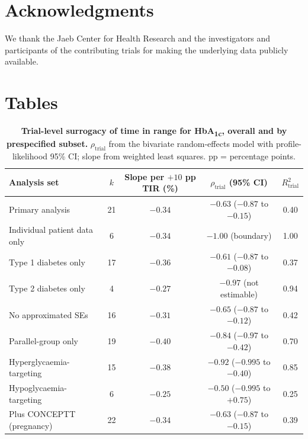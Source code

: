 \documentclass[11pt,a4paper]{article}
\newcommand{\pp}{percentage points}
\begin{document}
\section*{Acknowledgments}
We thank the Jaeb Center for Health Research and the investigators and participants of the contributing
trials for making the underlying data publicly available.

\clearpage

\section*{Tables}

\begin{table}[htbp]
\centering\small
\caption{\textbf{Trial-level surrogacy of time in range for HbA\textsubscript{1c}, overall and by
prespecified subset.} $\rho_{\mathrm{trial}}$ from the bivariate random-effects model with
profile-likelihood 95\% CI; slope from weighted least squares. pp = \pp.}
\begin{tabular}{lcccc}
\toprule
Analysis set & $k$ & Slope per $+10$ pp TIR (\%) & $\rho_{\mathrm{trial}}$ (95\% CI) & $R^2_{\mathrm{trial}}$\\
\midrule
Primary analysis            & 21 & $-0.34$ & $-0.63$ ($-0.87$ to $-0.15$) & 0.40\\
Individual patient data only & 6 & $-0.34$ & $-1.00$ (boundary)            & 1.00\\
Type 1 diabetes only        & 17 & $-0.36$ & $-0.61$ ($-0.87$ to $-0.08$) & 0.37\\
Type 2 diabetes only        &  4 & $-0.27$ & $-0.97$ (not estimable)       & 0.94\\
No approximated SEs         & 16 & $-0.31$ & $-0.65$ ($-0.87$ to $-0.12$) & 0.42\\
Parallel-group only         & 19 & $-0.40$ & $-0.84$ ($-0.97$ to $-0.42$) & 0.70\\
\addlinespace
Hyperglycaemia-targeting    & 15 & $-0.38$ & $-0.92$ ($-0.995$ to $-0.40$) & 0.85\\
Hypoglycaemia-targeting     &  6 & $-0.25$ & $-0.50$ ($-0.995$ to $+0.75$) & 0.25\\
\addlinespace
Plus CONCEPTT (pregnancy)   & 22 & $-0.34$ & $-0.63$ ($-0.87$ to $-0.15$) & 0.39\\
\bottomrule
\end{tabular}
\end{table}
\end{document}
